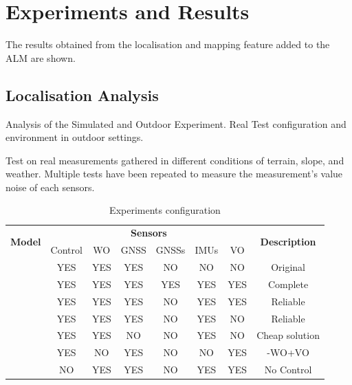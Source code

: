 \chapter{Experiments and Results}
\label{ch:results}


\noindent
The results obtained from the localisation and mapping feature added to the \gls{ALM} are shown.


\section{Localisation Analysis}
\label{sec:locRes}
\noindent Analysis of the Simulated and Outdoor Experiment.
Real Test configuration and environment in outdoor settings.

Test on real measurements gathered in different conditions of terrain, slope, and weather.
Multiple tests have been repeated to measure the measurement's value noise of each sensors.


\begin{table}[!ht]
	\small
	\begin{center}
		\label{tab:eval}
		\begin{tabular}{|c||c|c|c|c|c|c|c|}
			\hline
			\multirow{2}{*}{\textbf{Model}} & \multicolumn{6}{c|}{\textbf{Sensors}} & \multirow{2}{*}{\textbf{Description}}\\
			& \multicolumn{1}{c|}{Control} & \multicolumn{1}{c|}{\gls{WO}} & \multicolumn{1}{c|}{\gls{GNSS}}& \multicolumn{1}{c|}{\glspl{GNSS}} & \multicolumn{1}{c|}{\glspl{IMU}} & \multicolumn{1}{c|}{\gls{VO}} & \\
			\hline
			\hline
			\centering{1} & YES & YES & YES & NO & NO & NO & Original \\
			\hline
			\centering{2} & YES & YES & YES & YES & YES & YES & Complete \\
			\hline
			\centering{3} & YES & YES & YES & NO & YES & YES & Reliable \\
			\hline
			\centering{3-1} & YES & YES & YES & NO & YES & NO & Reliable \\
			\hline
			\centering{4} & YES & YES & NO & NO & YES & NO & Cheap solution \\
			\hline
			\centering{5} & YES & NO & YES & NO & NO & YES & -WO+VO \\
			\hline
			\centering{6} & NO & YES & YES & NO & YES & YES & No Control \\
			\hline
		\end{tabular}
		\caption{Experiments configuration}
	\end{center}
\end{table}

